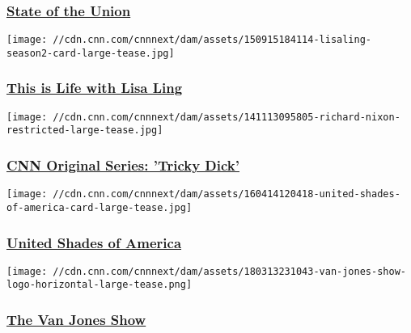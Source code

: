 \hypertarget{state-of-the-union}{%
\subsubsection{\texorpdfstring{\href{/shows/state-of-the-union}{State of
the Union}}{State of the Union}}\label{state-of-the-union}}

\href{/shows/this-is-life-with-lisa-ling}{}

\texttt{[image: //cdn.cnn.com/cnnnext/dam/assets/150915184114-lisaling-season2-card-large-tease.jpg]}

\hypertarget{this-is-life-with-lisa-ling}{%
\subsubsection{\texorpdfstring{\href{/shows/this-is-life-with-lisa-ling}{This
is Life with Lisa
Ling}}{This is Life with Lisa Ling}}\label{this-is-life-with-lisa-ling}}

\href{/shows/tricky-dick-original-series}{}

\texttt{[image: //cdn.cnn.com/cnnnext/dam/assets/141113095805-richard-nixon-restricted-large-tease.jpg]}

\hypertarget{cnn-original-series-tricky-dick}{%
\subsubsection{\texorpdfstring{\href{/shows/tricky-dick-original-series}{CNN
Original Series: 'Tricky
Dick'}}{CNN Original Series: 'Tricky Dick'}}\label{cnn-original-series-tricky-dick}}

\href{/shows/united-shades-of-america}{}

\texttt{[image: //cdn.cnn.com/cnnnext/dam/assets/160414120418-united-shades-of-america-card-large-tease.jpg]}

\hypertarget{united-shades-of-america}{%
\subsubsection{\texorpdfstring{\href{/shows/united-shades-of-america}{United
Shades of
America}}{United Shades of America}}\label{united-shades-of-america}}

\href{/shows/the-van-jones-show}{}

\texttt{[image: //cdn.cnn.com/cnnnext/dam/assets/180313231043-van-jones-show-logo-horizontal-large-tease.png]}

\hypertarget{the-van-jones-show}{%
\subsubsection{\texorpdfstring{\href{/shows/the-van-jones-show}{The Van
Jones Show}}{The Van Jones Show}}\label{the-van-jones-show}}

